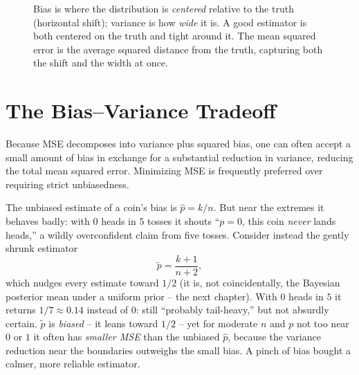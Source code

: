 \begin{figure}[H]
\centering
{}
\caption{Bias is where the distribution is \emph{centered} relative to the truth
(horizontal shift); variance is how \emph{wide} it is. A good estimator is both
centered on the truth and tight around it. The mean squared error is the average
squared distance from the truth, capturing both the shift and the width at once.}
\label{ch30:fig-bias-variance}
\end{figure}

\section{The Bias--Variance Tradeoff}
\label{ch30:bv-tradeoff}

Because MSE decomposes into variance plus squared bias, one can often accept a small
amount of bias in exchange for a substantial reduction in variance, reducing the total mean squared error.
Minimizing MSE is frequently preferred over requiring strict unbiasedness.

\begin{example}
\label{ch30:ex-shrinkage}
The unbiased estimate of a coin's bias is $\hat p = k/n$. But near the extremes
it behaves badly: with $0$ heads in $5$ tosses it shouts ``$p=0$, this coin
\emph{never} lands heads,'' a wildly overconfident claim from five tosses.
Consider instead the gently shrunk estimator
\[
  \tilde p = \frac{k+1}{n+2},
\]
which nudges every estimate toward $1/2$ (it is, not coincidentally, the
Bayesian posterior mean under a uniform prior -- the next chapter). With $0$
heads in $5$ it returns $1/7\approx 0.14$ instead of $0$: still ``probably
tail-heavy,'' but not absurdly certain. $\tilde p$ is \emph{biased} -- it leans
toward $1/2$ -- yet for moderate $n$ and $p$ not too near $0$ or $1$ it often has
\emph{smaller MSE} than the unbiased $\hat p$, because the variance reduction
near the boundaries outweighs the small bias. A pinch of bias bought a calmer,
more reliable estimator.
\end{example}

